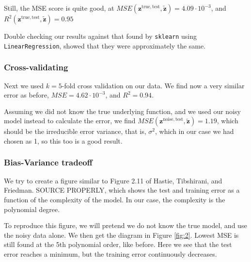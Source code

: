 \documentclass[a4paper,10pt,english]{article}
\def\code#1{\texttt{#1}} %
\begin{document}
Still, the MSE score is quite good, at $MSE(\bm{z}^\mathrm{true,test}, \bm{\tilde z})=4.09\cdot 10 ^{-3}$, and $R^2(\bm{z}^\mathrm{true,test}, \bm{\tilde z})=0.95$

Double checking our results against that found by \code{sklearn} using \code{LinearRegression}, showed that they were approximately the same.

\subsubsection{Cross-validating}
Next we used $k=5$-fold cross validation on our data.
We find now a very similar error as before, $MSE = 4.62\cdot 10^{-3}$, and $R^2= 0.94$.

Assuming we did not know the true underlying function, and we used our noisy model instead to calculate the error, we find
$MSE(\bm{z}^\mathrm{noise,test}, \bm{\tilde z}) = 1.19$,
which should be the irreducible error variance, that is, $\sigma^2$, which in our case we had chosen as 1, so this too is a good result.


\subsubsection{ Bias-Variance tradeoff}
We try to create a figure similar to Figure 2.11 of Hastie, Tibshirani, and Friedman. SOURCE PROPERLY, which shows the test and training error as a function of the complexity of the model. In our case, the complexity is the polynomial degree.

To reproduce this figure, we will pretend we do not know the true model, and use the noisy data alone. We then get the diagram in Figure \ref{fig:2}. Lowest MSE is still found at the 5th polynomial order, like before. Here we see that the test error reaches a minimum, but the training error continuously decreases.
 
\end{document}
